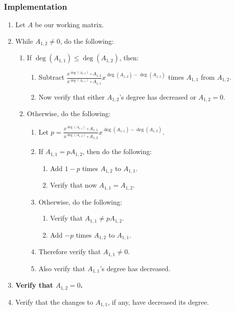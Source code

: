 \documentclass[twocolumn]{article}
\begin{document}
			\subsubsection{Implementation}
				\begin{enumerate}
					\item Let $A$ be our working matrix.
					\item While $A_{1,2}\ne 0$, do the following:
					\begin{enumerate}
						\item If $\deg(A_{1,1})\le\deg(A_{1,2})$, then:
						\begin{enumerate}
							\item Subtract $\frac{x^{\deg(A_{1,2})}\circ A_{1,2}}{x^{\deg(A_{1,1})}\circ A_{1,1}}x^{\deg(A_{1,2})-\deg(A_{1,1})}$ times $A_{1,1}$ from $A_{1,2}$.
							\item Now verify that either $A_{1,2}$'s degree has decreased or $A_{1,2}=0$.
						\end{enumerate}
						\item Otherwise, do the following:
						\begin{enumerate}
							\item Let $p=\frac{x^{\deg(A_{1,1})}\circ A_{1,1}}{x^{\deg(A_{1,2})}\circ A_{1,2}}x^{\deg(A_{1,1})-\deg(A_{1,2})}$.
							\item If $A_{1,1}=pA_{1,2}$, then do the following:
							\begin{enumerate}
								\item Add $1-p$ times $A_{1,2}$ to $A_{1,1}$.
								\item Verify that now $A_{1,1}=A_{1,2}$.
							\end{enumerate}
							\item Otherwise, do the following:
							\begin{enumerate}
								\item Verify that $A_{1,1}\ne pA_{1,2}$.
								\item Add $-p$ times $A_{1,2}$ to $A_{1,1}$.
							\end{enumerate}
							\item Therefore verify that $A_{1,1}\ne 0$.
							\item Also verify that $A_{1,1}$'s degree has decreased.
						\end{enumerate}
					\end{enumerate}
					\item \textbf{Verify that $A_{1,2}=0$.}
					\item Verify that the changes to $A_{1,1}$, if any, have decreased its degree.

\end{enumerate}
\end{document}
